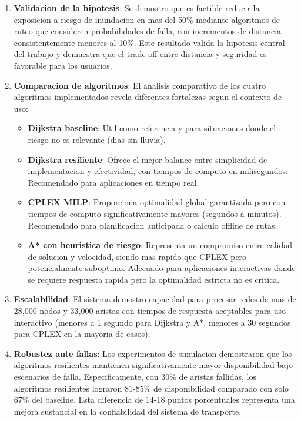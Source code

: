 \documentclass[conference]{IEEEtran}
\begin{document}
\begin{enumerate}
    \item \textbf{Validacion de la hipotesis}: Se demostro que es factible reducir la exposicion a riesgo de inundacion en mas del 50\% mediante algoritmos de ruteo que consideren probabilidades de falla, con incrementos de distancia consistentemente menores al 10\%. Este resultado valida la hipotesis central del trabajo y demuestra que el trade-off entre distancia y seguridad es favorable para los usuarios.

    \item \textbf{Comparacion de algoritmos}: El analisis comparativo de los cuatro algoritmos implementados revela diferentes fortalezas segun el contexto de uso:
    \begin{itemize}
        \item \textbf{Dijkstra baseline}: Util como referencia y para situaciones donde el riesgo no es relevante (dias sin lluvia).
        \item \textbf{Dijkstra resiliente}: Ofrece el mejor balance entre simplicidad de implementacion y efectividad, con tiempos de computo en milisegundos. Recomendado para aplicaciones en tiempo real.
        \item \textbf{CPLEX MILP}: Proporciona optimalidad global garantizada pero con tiempos de computo significativamente mayores (segundos a minutos). Recomendado para planificacion anticipada o calculo offline de rutas.
        \item \textbf{A* con heuristica de riesgo}: Representa un compromiso entre calidad de solucion y velocidad, siendo mas rapido que CPLEX pero potencialmente suboptimo. Adecuado para aplicaciones interactivas donde se requiere respuesta rapida pero la optimalidad estricta no es critica.
    \end{itemize}

    \item \textbf{Escalabilidad}: El sistema demostro capacidad para procesar redes de mas de 28,000 nodos y 33,000 aristas con tiempos de respuesta aceptables para uso interactivo (menores a 1 segundo para Dijkstra y A*, menores a 30 segundos para CPLEX en la mayoria de casos).

    \item \textbf{Robustez ante fallas}: Los experimentos de simulacion demostraron que los algoritmos resilientes mantienen significativamente mayor disponibilidad bajo escenarios de falla. Especificamente, con 30\% de aristas fallidas, los algoritmos resilientes lograron 81-85\% de disponibilidad comparado con solo 67\% del baseline. Esta diferencia de 14-18 puntos porcentuales representa una mejora sustancial en la confiabilidad del sistema de transporte.


\end{enumerate}
\end{document}
